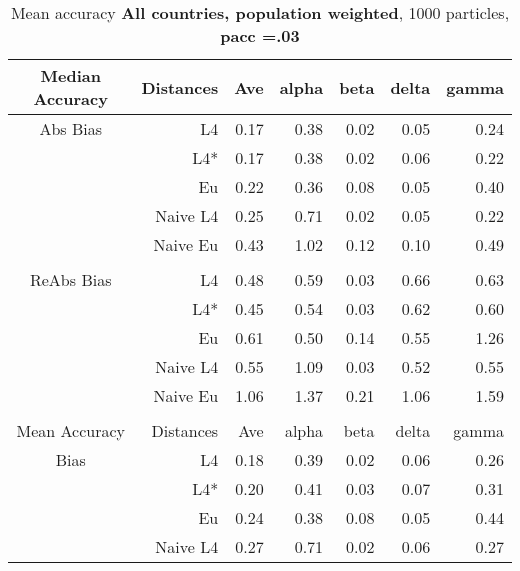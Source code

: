 \documentclass[a4paper,12pt,twoside]{book}
\begin{document}
\begin{table}[H]

\centering
\vfill
\vspace{2cm}
\caption{Mean  accuracy \textbf{All countries, population weighted}, 1000 particles, \textbf{pacc =.03}}


\begin{tabular}{crrrrrr}

  \hline
  
{\color{blue}Median Accuracy} & Distances & Ave & alpha & beta & delta & gamma \\ 
  \hline
{\color{blue}Abs Bias} & L4  &0.17 & 0.38 & 0.02 & 0.05 & 0.24 \\ 
 
&L4*  & 0.17 & 0.38 & 0.02 & 0.06 & 0.22 \\ 
  
&Eu &   0.22 & 0.36 & 0.08 & 0.05 & 0.40 \\ 
 
&Naive L4&      
  0.25 & 0.71 & 0.02 & 0.05 & 0.22 \\ 
&Naive Eu &  0.43 & 1.02 & 0.12 & 0.10 & 0.49 \\ \\
   \hline
   
{\color{blue} ReAbs Bias } & L4  &0.48 & 0.59 & 0.03 & 0.66 & 0.63 \\ 
  
&L4*  &0.45 & 0.54 & 0.03 & 0.62 & 0.60 \\ 
  
&Eu &   
 0.61 & 0.50 & 0.14 & 0.55 & 1.26 \\ 
  
&Naive L4&   
0.55 & 1.09 & 0.03 & 0.52 & 0.55 \\ 
&Naive Eu &   1.06 & 1.37 & 0.21 & 1.06 & 1.59 \\ \\
  
   \hline
{\color{blue}Mean Accuracy} & Distances & Ave & alpha & beta & delta & gamma \\ 
  \hline
{\color{blue}Bias} & L4  &0.18 & 0.39 & 0.02 & 0.06 & 0.26 \\ 
  
&L4*  & 0.20 & 0.41 & 0.03 & 0.07 & 0.31 \\ 
  
  
&Eu &   0.24 & 0.38 & 0.08 & 0.05 & 0.44 \\ 
  
   
&Naive L4&  
   
  0.27 & 0.71 & 0.02 & 0.06 & 0.27 \\ 
   

\end{tabular}
\end{table}
\end{document}
